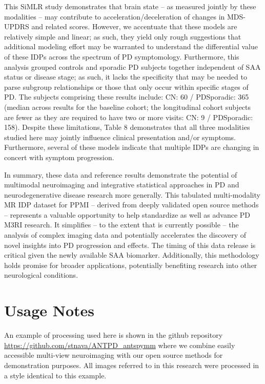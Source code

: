 \documentclass[
  table]{article}
\begin{document}
This SiMLR study demonstrates that brain state -- as measured jointly by
these modalities -- may contribute to acceleration/deceleration of
changes in MDS-UPDRS and related scores. However, we accentuate that
these models are relatively simple and linear; as such, they yield only
rough suggestions that additional modeling effort may be warranted to
understand the differential value of these IDPs across the spectrum of
PD symptomology. Furthermore, this analysis grouped controls and
sporadic PD subjects together independent of SAA status or disease
stage; as such, it lacks the specificity that may be needed to parse
subgroup relationships or those that only occur within specific stages
of PD. The subjects comprising these results include: CN: 60 /
PDSporadic: 365 (median across results for the baseline cohort; the
longitudinal cohort subjects are fewer as they are required to have two
or more visits: CN: 9 / PDSporadic: 158). Despite these limitations,
Table 8 demonstrates that all three modalities studied here may jointly
influence clinical presentation and/or symptoms. Furthermore, several of
these models indicate that multiple IDPs are changing in concert with
symptom progression.

In summary, these data and reference results demonstrate the potential
of multimodal neuroimaging and integrative statistical approaches in PD
and neurodegenerative disease research more generally. This tabulated
multi-modality MR IDP dataset for PPMI -- derived from deeply validated
open source methods -- represents a valuable opportunity to help
standardize as well as advance PD M3RI research. It simplifies -- to the
extent that is currently possible -- the analysis of complex imaging
data and potentially accelerates the discovery of novel insights into PD
progression and effects. The timing of this data release is critical
given the newly available SAA biomarker. Additionally, this methodology
holds promise for broader applications, potentially benefiting research
into other neurological conditions.

\section{Usage Notes}\label{usage-notes}

An example of processing used here is shown in the github repository
\url{https://github.com/stnava/ANTPD_antspymm} where we combine easily
accessible multi-view neuroimaging with our open source methods for
demonstration purposes. All images referred to in this research were
processed in a style identical to this example.
\end{document}

